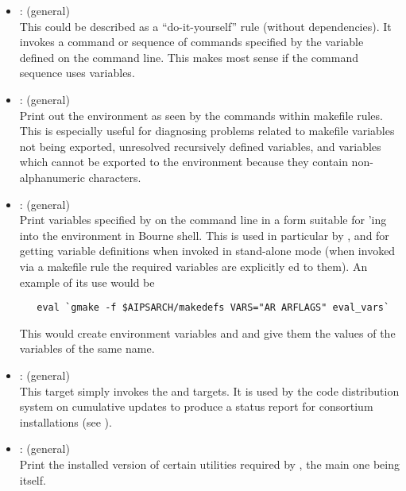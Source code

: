 \begin{itemize}
\item
    : (general)
   \\ This could be described as a ``do-it-yourself'' rule (without
   dependencies).  It invokes a command or sequence of commands specified by
   the  variable defined on the  command line.
   This makes most sense if the command sequence uses 
   variables.

\item
    : (general)
   \\ Print out the environment as seen by the commands within makefile rules.
   This is especially useful for diagnosing problems related to makefile
   variables not being exported, unresolved recursively defined variables, and
   variables which cannot be exported to the environment because they contain
   non-alphanumeric characters.

\item
    : (general)
   \\ Print variables specified by  on the  command
   line in a form suitable for 'ing into the environment in
   Bourne shell.  This is used in particular by ,
    and  for getting 
   variable definitions when invoked in stand-alone mode (when invoked via a
   makefile rule the required variables are explicitly ed to
   them).  An example of its use would be

\begin{verbatim}
   eval `gmake -f $AIPSARCH/makedefs VARS="AR ARFLAGS" eval_vars`
\end{verbatim}

   \noindent
   This would create environment variables  and  and
   give them the values of the  variables of the same name.

\item
    : (general)
   \\ This target simply invokes the  and 
   targets.  It is used by the code distribution system on cumulative updates
   to produce a status report for consortium installations (see
   ).

\item
    : (general)
   \\ Print the installed version of certain utilities required by \aipspp,
   the main one being  itself.


\end{itemize}
